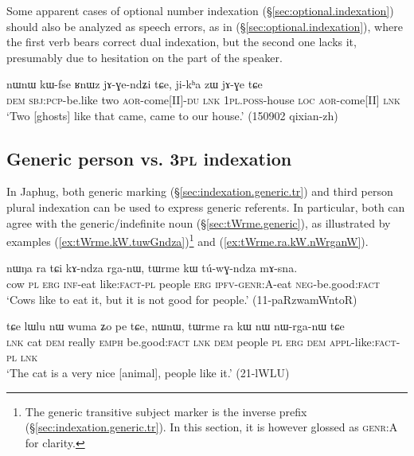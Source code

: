 Some apparent cases of optional number indexation (§\ref{sec:optional.indexation}) should also be analyzed as speech errors, as in (§\ref{sec:optional.indexation}), where the first verb  bears correct dual indexation, but the second one lacks it, presumably due to hesitation on the part of the speaker.

\begin{exe}
\ex \label{ex:jAGendZi.du}
\gll   nɯnɯ kɯ-fse ʁnɯz jɤ-ɣe-ndʑi tɕe,  ji-kʰa zɯ jɤ-ɣe tɕe \\
\textsc{dem} \textsc{sbj}:\textsc{pcp}-be.like two \textsc{aor}-come[II]-\textsc{du} \textsc{lnk}  \textsc{1pl}.\textsc{poss}-house \textsc{loc} \textsc{aor}-come[II] \textsc{lnk} \\
\glt `Two [ghosts] like that came, came to our house.' (150902 qixian-zh) 
\end{exe} 

\subsection{Generic person vs. \textsc{3pl} indexation} \label{sec:genr.3pl}
 
In Japhug, both generic marking (§\ref{sec:indexation.generic.tr}) and third person plural indexation can be used to express generic referents. In particular, both can agree with the generic/indefinite noun  (§\ref{sec:tWrme.generic}), as illustrated by examples (\ref{ex:tWrme.kW.tuwGndza})\footnote{The generic transitive subject marker is the inverse prefix (§\ref{sec:indexation.generic.tr}). In this section, it is however glossed as \textsc{genr}:A for clarity. } and (\ref{ex:tWrme.ra.kW.nWrganW}).


\begin{exe}
\ex   \label{ex:tWrme.kW.tuwGndza}
 \gll nɯŋa ra tɕi kɤ-ndza rga-nɯ, tɯrme kɯ tú-wɣ-ndza mɤ-sna. \\
cow \textsc{pl} \textsc{erg} \textsc{inf}-eat like:\textsc{fact}-\textsc{pl} people \textsc{erg} \textsc{ipfv}-\textsc{genr}:\textsc{A}-eat \textsc{neg}-be.good:\textsc{fact} \\
\glt `Cows like to eat it, but it is not good for people.' (11-paRzwamWntoR)
\end{exe}

\begin{exe}
\ex   \label{ex:tWrme.ra.kW.nWrganW}
 \gll  tɕe lɯlu nɯ wuma ʑo pe tɕe, nɯnɯ, tɯrme ra kɯ nɯ nɯ-rga-nɯ tɕe \\
\textsc{lnk} cat \textsc{dem} really \textsc{emph} be.good:\textsc{fact} \textsc{lnk} \textsc{dem} people \textsc{pl} \textsc{erg} \textsc{dem} \textsc{appl}-like:\textsc{fact}-\textsc{pl} \textsc{lnk} \\
\glt `The cat is a very nice [animal], people like it.' (21-lWLU)
\end{exe}


